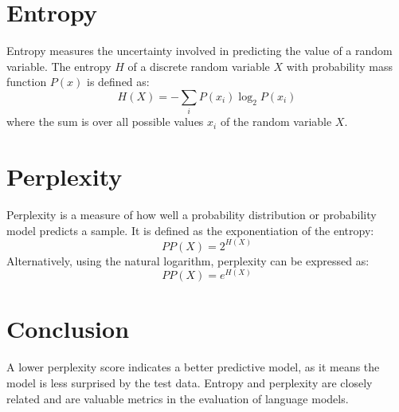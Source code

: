 \documentclass[11pt]{article}
\begin{document}
    \section{Entropy}
    Entropy measures the uncertainty involved in predicting the value of a random variable. The entropy \(H\) of a discrete random variable \(X\) with probability mass function \(P(x)\) is defined as:
    \begin{equation}
        H(X) = -\sum_{i} P(x_i) \log_2 P(x_i)
    \end{equation}
    where the sum is over all possible values \(x_i\) of the random variable \(X\).


    \section{Perplexity}
    Perplexity is a measure of how well a probability distribution or probability model predicts a sample. It is defined as the exponentiation of the entropy:
    \begin{equation}
        PP(X) = 2^{H(X)}
    \end{equation}
    Alternatively, using the natural logarithm, perplexity can be expressed as:
    \begin{equation}
        PP(X) = e^{H(X)}
    \end{equation}


    \section{Conclusion}
    A lower perplexity score indicates a better predictive model, as it means the model is less surprised by the test data. Entropy and perplexity are closely related and are valuable metrics in the evaluation of language models.
\end{document}
